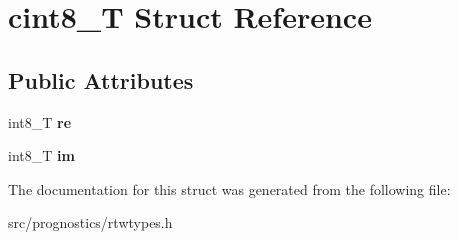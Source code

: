 \hypertarget{structcint8__T}{}\section{cint8\+\_\+T Struct Reference}
\label{structcint8__T}
\subsection*{Public Attributes}
\begin{DoxyCompactItemize}
\item 
\mbox{\label{structcint8__T_a0721b0544133b8973c6d947dde3742bf}} 
int8\+\_\+T {\bfseries re}
\item 
\mbox{\label{structcint8__T_af8cb7698314ba66767b164336dc4e4dc}} 
int8\+\_\+T {\bfseries im}
\end{DoxyCompactItemize}


The documentation for this struct was generated from the following file\+:\begin{DoxyCompactItemize}
\item 
src/prognostics/rtwtypes.\+h\end{DoxyCompactItemize}
